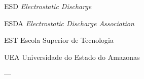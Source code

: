 \documentclass[
	12pt,				%
	openright,			%
	oneside,			%
	a4paper,			%
	chapter=TITLE,		%
	english,			%
	french,				%
	spanish,			%
	brazil,				%
	article,			%
	]{uea-abntex2}
\begin{document}
\frenchspacing 


\imprimircapa

\imprimirfolhaderosto




\begin{siglas}
  \item[ESD] \textit{Electrostatic Discharge}
  \item[ESDA] \textit{Electrostatic Discharge Association}
  \item[EST] Escola Superior de Tecnologia
  \item[UEA] Universidade do Estado do Amazonas 
\end{siglas}
 ---


\tableofcontents*


\pagestyle{simple}

\textual
\newpage
\end{document}
